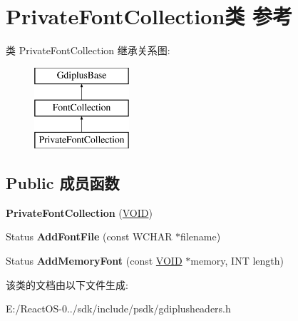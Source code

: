 \hypertarget{class_private_font_collection}{}\section{Private\+Font\+Collection类 参考}
\label{class_private_font_collection}
类 Private\+Font\+Collection 继承关系图\+:\begin{figure}[H]
\begin{center}
\leavevmode
\includegraphics[height=3.000000cm]{class_private_font_collection}
\end{center}
\end{figure}
\subsection*{Public 成员函数}
\begin{DoxyCompactItemize}
\item 
\mbox{\label{class_private_font_collection_aa2e0f3c7fcb517ed5e2140e7a3264893}} 
{\bfseries Private\+Font\+Collection} (\hyperlink{interfacevoid}{V\+O\+ID})
\item 
\mbox{\label{class_private_font_collection_a296fa9bb68228a6e20614e2244669c93}} 
Status {\bfseries Add\+Font\+File} (const W\+C\+H\+AR $\ast$filename)
\item 
\mbox{\label{class_private_font_collection_af0ed3e956ece12a5e835b65beba74e2b}} 
Status {\bfseries Add\+Memory\+Font} (const \hyperlink{interfacevoid}{V\+O\+ID} $\ast$memory, I\+NT length)
\end{DoxyCompactItemize}


该类的文档由以下文件生成\+:\begin{DoxyCompactItemize}
\item 
E\+:/\+React\+O\+S-\/0../sdk/include/psdk/gdiplusheaders.\+h\end{DoxyCompactItemize}
